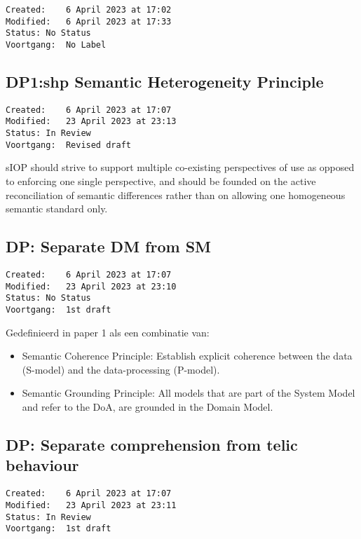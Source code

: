 \documentclass[sort&compress,preprint,3p,authoryear,twocolumn]{elsarticle}
\providecommand{\tightlist}{%
  \setlength{\itemsep}{0pt}\setlength{\parskip}{0pt}}
\theoremstyle{break}			%
\begin{document}
\begin{verbatim}
Created:    6 April 2023 at 17:02
Modified:   6 April 2023 at 17:33
Status: No Status
Voortgang:  No Label
\end{verbatim}

\subsection{DP1:shp Semantic Heterogeneity
Principle}\label{dp1shp-semantic-heterogeneity-principle}

\begin{verbatim}
Created:    6 April 2023 at 17:07
Modified:   23 April 2023 at 23:13
Status: In Review
Voortgang:  Revised draft
\end{verbatim}

sIOP should strive to support multiple co-existing perspectives of use
as opposed to enforcing one single perspective, and should be founded on
the active reconciliation of semantic differences rather than on
allowing one homogeneous semantic standard only.

\subsection{DP: Separate DM from SM}\label{dp-separate-dm-from-sm}

\begin{verbatim}
Created:    6 April 2023 at 17:07
Modified:   23 April 2023 at 23:10
Status: No Status
Voortgang:  1st draft
\end{verbatim}

Gedefinieerd in paper 1 als een combinatie van:

\begin{itemize}
\tightlist
\item
  Semantic Coherence Principle: Establish explicit coherence between the
  data (S-model) and the data-processing (P-model).
\item
  Semantic Grounding Principle: All models that are part of the System
  Model and refer to the DoA, are grounded in the Domain Model.
\end{itemize}

\subsection{DP: Separate comprehension from telic
behaviour}\label{dp-separate-comprehension-from-telic-behaviour}

\begin{verbatim}
Created:    6 April 2023 at 17:07
Modified:   23 April 2023 at 23:11
Status: In Review
Voortgang:  1st draft
\end{verbatim}
\end{document}
